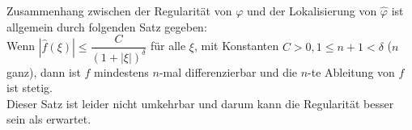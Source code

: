 Zusammenhang zwischen der Regularität von $\varphi$ und der Lokalisierung von $\hat{\varphi}$ ist allgemein durch folgenden Satz gegeben:\\
Wenn $|\hat{f}(\xi)| \leq \dfrac{C}{(1+|\xi|)^\delta}$ für alle $\xi$, mit Konstanten $C>0, 1\leq n+1 < \delta$ ($n$ ganz), dann ist $f$ mindestens $n$-mal differenzierbar und die $n$-te Ableitung von $f$ ist stetig.\\

Dieser Satz ist leider nicht umkehrbar und darum kann die Regularität besser sein als erwartet.
